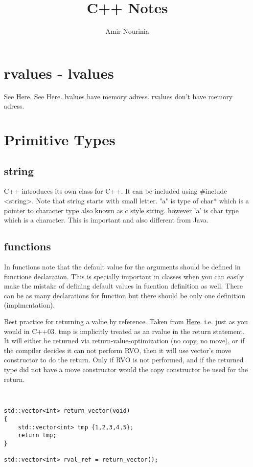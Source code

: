 \documentclass[11pt,twoside,a4paper]{report}
\author{Amir Nourinia}
\title{C++ Notes}
\begin{document}
\maketitle
\tableofcontents
\chapter{rvalues - lvalues}
See \href{http://thbecker.net/articles/rvalue_references/section_01.html}{Here.}
See \href{https://stackoverflow.com/questions/34221287/how-are-rvalues-in-c-stored-in-memory}{Here.}
lvalues have memory adress. rvalues don't have memory adress.
\chapter{Primitive Types}

\section{string}
C++ introduces its own class for C++. It can be included using \#include <string>.
Note that string starts with small letter.
"a" is type of char* which is a pointer to character type also known as c style string.
however 'a' is char type which is a character. This is important and also different from Java.


\section{functions}
In functions note that the default value for the arguments should be defined in functione declaration. This is specially important in classes when you can easily make the mistake of defining default values in fucntion definition as well.
There can be as many declarations for function but there should be only one definition (implmentation).

Best practice for returning a value by reference. Taken from \href{https://stackoverflow.com/questions/4986673/c11-rvalues-and-move-semantics-confusion-return-statement}{Here}.
i.e. just as you would in C++03. tmp is implicitly treated as an rvalue in the return statement. It will either be returned via return-value-optimization (no copy, no move), or if the compiler decides it can not perform RVO, then it will use vector's move constructor to do the return. Only if RVO is not performed, and if the returned type did not have a move constructor would the copy constructor be used for the return.
\begin{lstlisting}


std::vector<int> return_vector(void)
{
    std::vector<int> tmp {1,2,3,4,5};
    return tmp;
}

std::vector<int> rval_ref = return_vector();

\end{lstlisting}
\end{document}
